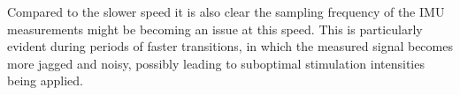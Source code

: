 Compared to the slower speed it is also clear the sampling frequency of the IMU measurements might be becoming an issue at this speed. This is particularly evident during periods of faster transitions, in which the measured signal becomes more jagged and noisy, possibly leading to suboptimal stimulation intensities being applied. 



